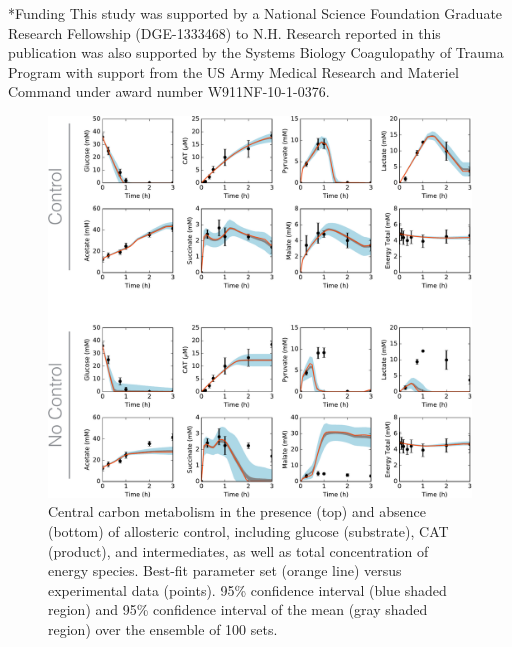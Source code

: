 \documentclass[12pt]{article}
\makeatletter
\renewcommand\section{\@startsection
	{subsection}{2}{0mm}
	{-0.2in}
	{0.05\baselineskip}
	{\normalfont\large\bfseries}}
\makeatother
\begin{document}
\section*{Funding}
This study was supported by a National Science Foundation Graduate Research Fellowship (DGE-1333468) to N.H.
Research reported in this publication was also supported by the Systems Biology Coagulopathy of Trauma Program
with support from the US Army Medical Research and Materiel Command under award number W911NF-10-1-0376.

\clearpage



\clearpage


\begin{figure}[ht]
\centering
\includegraphics[width=1.00\textwidth]{./Figures/allostericControl_noindex.pdf}
\caption{Central carbon metabolism in the presence (top) and absence (bottom) of allosteric control, including glucose (substrate), CAT (product), and intermediates, as well as total concentration of energy species. Best-fit parameter set (orange line) versus experimental data (points). 95\% confidence interval (blue shaded region) and 95\% confidence interval of the mean (gray shaded region) over the ensemble of 100 sets.}
\label{fig:CarbonBoth}
\end{figure}
\end{document}
